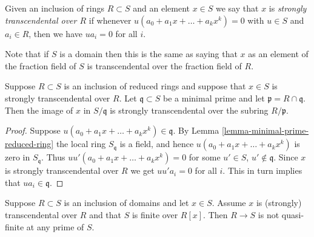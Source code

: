 \begin{definition}
\label{definition-strongly-transcendental}
Given an inclusion of rings $R \subset S$ and
an element $x \in S$ we say that $x$ is
{\it strongly transcendental over $R$} if
whenever $u(a_0 + a_1 x + \ldots + a_k x^k) = 0$
with $u \in S$ and $a_i \in R$, then
we have $ua_i = 0$ for all $i$.
\end{definition}

\noindent
Note that if $S$ is a domain then this is the same as
saying that $x$ as an element of the fraction field of
$S$ is transcendental over the fraction field of $R$.

\begin{lemma}
\label{lemma-reduced-strongly-transcendental-minimal-prime}
Suppose $R \subset S$ is an inclusion of reduced rings
and suppose that $x \in S$ is strongly transcendental over $R$.
Let $\mathfrak q \subset S$ be a minimal prime
and let $\mathfrak p = R \cap \mathfrak q$.
Then the image of $x$ in $S/\mathfrak q$ is strongly
transcendental over the subring $R/\mathfrak p$.
\end{lemma}

\begin{proof}
Suppose $u(a_0 + a_1x + \ldots + a_k x^k) \in \mathfrak q$.
By Lemma \ref{lemma-minimal-prime-reduced-ring}
the local ring $S_{\mathfrak q}$ is a field,
and hence $u(a_0 + a_1x + \ldots + a_k x^k) $ is zero
in $S_{\mathfrak q}$. Thus $uu'(a_0 + a_1x + \ldots + a_k x^k) = 0$
for some $u' \in S$, $u' \not\in \mathfrak q$.
Since $x$ is strongly transcendental over $R$ we get
$uu'a_i = 0$ for all $i$. This in turn implies
that $ua_i \in \mathfrak q$.
\end{proof}

\begin{lemma}
\label{lemma-domains-transcendental-not-quasi-finite}
Suppose $R\subset S$ is an inclusion of domains and
let $x \in S$. Assume $x$ is (strongly) transcendental over $R$
and that $S$ is finite over $R[x]$. Then $R \to S$ is not
quasi-finite at any prime of $S$.
\end{lemma}

